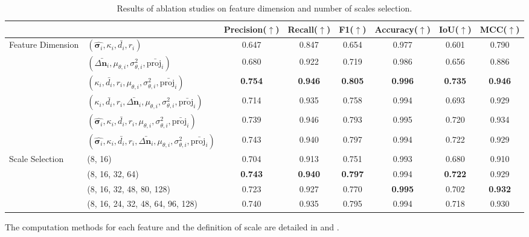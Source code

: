 \documentclass[lettersize,journal]{IEEEtran}
\begin{document}
\begin{table}[ht]
    \centering
    \small
    \setlength{\tabcolsep}{7pt}
    \caption{Results of ablation studies on feature dimension and number of scales selection.}
    \label{tab:ablation_study}
    \begin{threeparttable}
    \begin{tabular}{llcccccc}
            \toprule
            &  & Precision($\uparrow$) & Recall($\uparrow$)  & F1($\uparrow$) & Accuracy($\uparrow$) & IoU($\uparrow$) & MCC($\uparrow$) \\
            \midrule
    
            \multirow{6}{*}{Feature Dimension}
            & $(\hat{\mathbf{\sigma}_i}, \kappa_i, \bar{d_i}, r_i)$ & 0.647 & 0.847 & 0.654 & 0.977 & 0.601 & 0.790 \\
            & $(\bar{\Delta \mathbf{n}_i}, \mu_{\theta,i}, \sigma^2_{\theta,i}, \bar{\text{proj}_i})$ & 0.680 & 0.922 & 0.719 & 0.986 & 0.656 & 0.886 \\
            & $(\kappa_i, \bar{d_i}, r_i, \mu_{\theta,i}, \sigma^2_{\theta,i}, \bar{\text{proj}_i})$ & \textbf{0.754} & \textbf{0.946} & \textbf{0.805} & \textbf{0.996} & \textbf{0.735} & \textbf{0.946} \\
            & $(\kappa_i, \bar{d_i}, r_i, \bar{\Delta \mathbf{n}_i}, \mu_{\theta,i}, \sigma^2_{\theta,i}, \bar{\text{proj}_i})$ & 0.714 & 0.935 & 0.758 & 0.994 & 0.693 & 0.929 \\
            & $(\hat{\mathbf{\sigma}_i}, \kappa_i, \bar{d_i}, r_i, \mu_{\theta,i}, \sigma^2_{\theta,i}, \bar{\text{proj}_i})$ & 0.739 & 0.946 & 0.793 & 0.995 & 0.720 & 0.934 \\
            & $(\hat{\mathbf{\sigma}_i}, \kappa_i, \bar{d_i}, r_i, \bar{\Delta \mathbf{n}_i}, \mu_{\theta,i}, \sigma^2_{\theta,i}, \bar{\text{proj}_i})$ & 0.743 & 0.940 & 0.797 & 0.994 & 0.722 & 0.929 \\
            
            \midrule
            
            \multirow{4}{*}{Scale Selection}
            & (8, 16) & 0.704 & 0.913 & 0.751 & 0.993 & 0.680 & 0.910 \\
            & (8, 16, 32, 64) & \textbf{0.743} & \textbf{0.940} & \textbf{0.797} & 0.994 & \textbf{0.722} & 0.929 \\
            & (8, 16, 32, 48, 80, 128) & 0.723 & 0.927 & 0.770 & \textbf{0.995} & 0.702 & \textbf{0.932} \\
            & (8, 16, 24, 32, 48, 64, 96, 128) & 0.740 & 0.935 & 0.795 & 0.994 & 0.718 & 0.930 \\
            
            \bottomrule
        \end{tabular}
        \begin{tablenotes}
            \footnotesize
             The computation methods for each feature and the definition of scale are detailed in  and .
        \end{tablenotes}
        \end{threeparttable}
        
\end{table}
\end{document}
